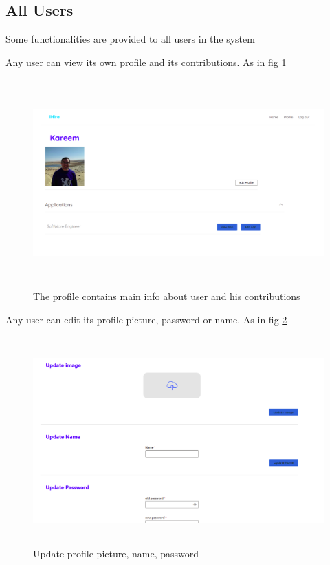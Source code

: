 \subsection{All Users}

Some functionalities are provided to all users in the system

Any user can view its own profile and its contributions. As in fig \ref{fig:user_view_profile}

\begin{figure}[h!]
\centering
\includegraphics[width=14cm,height=8cm, frame]{images/User Interface/user_view_profile.png}
\caption{The profile contains main info about user and his contributions}
\label{fig:user_view_profile}
\end{figure}

Any user can edit its profile picture, password or name. As in fig \ref{fig:user_edit_profile}

\begin{figure}[h!]
\centering
\includegraphics[width=14cm,height=8cm, frame]{images/User Interface/user_edit_profile.png}
\caption{Update profile picture, name, password}
\label{fig:user_edit_profile}
\end{figure}
